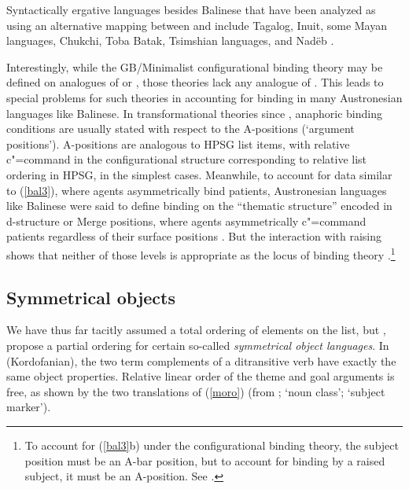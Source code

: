 \documentclass[output=paper
                ,modfonts
                ,nonflat
	        ,collection
	        ,collectionchapter
	        ,collectiontoclongg
 	        ,biblatex
                ,babelshorthands
                ,newtxmath
                ,draftmode
                ,colorlinks, citecolor=brown
]{./langsci/langscibook}
\begin{document}
Syntactically ergative languages besides Balinese that have been analyzed as using an alternative mapping between \argst and \val include Tagalog, Inuit, some Mayan languages, Chukchi, Toba Batak, Tsimshian languages, and Nad{\"e}b \citep{Manning1996,Manning+Sag:1999}.  

Interestingly, while the GB/Minimalist configurational binding theory may be defined on analogues of \val or \content,  those theories lack any analogue of \argst.  This leads to special problems for such theories in accounting for binding in many Austronesian languages like Balinese.  In transformational theories since \citet{Chomsky:1981}, anaphoric binding conditions are usually stated with respect to the A-positions (`argument positions').  A-positions are analogous to HPSG \val list items, with relative c"=command in the configurational structure corresponding to relative list ordering in HPSG, in the simplest cases.  Meanwhile, to account for data similar to (\ref{bal3}), where agents asymmetrically bind patients, Austronesian languages like Balinese were said to define binding on the ``thematic structure'' encoded in d-structure or Merge positions, where agents asymmetrically c"=command patients regardless of their surface positions \citep{Guilfoyle+etal:1992}.  But the interaction with raising shows that neither of those levels is appropriate as the locus of binding theory \citep{Wechsler1999}.\footnote{To account for (\ref{bal3}b) under the configurational binding theory, the subject position must be an A-bar position, but to account for binding by a raised subject, it must be an A-position.  See \citet{Wechsler1999}. } 



\subsection{Symmetrical objects}
We have thus far tacitly assumed a total ordering of elements on the \argst list, but \citet{AMM2013a}, \citet{Ackermanetal2017} propose a partial ordering
 for certain so-called \emph{symmetrical object languages}.  In  (Kordofanian), the two term complements of a ditransitive  verb have exactly the same object properties.  Relative linear order of the theme and goal arguments is free, as shown by the two translations of (\ref{moro}) (from \citealt[9]{Ackermanetal2017};  `noun class';  `subject marker').
\end{document}
